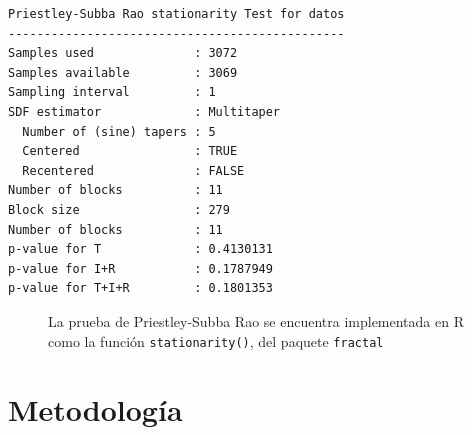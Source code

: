 \documentclass{beamer}
\begin{document}

\begin{lrbox}{\mybox}%
\begin{lstlisting}[caption={}]
Priestley-Subba Rao stationarity Test for datos
-----------------------------------------------
Samples used              : 3072 
Samples available         : 3069 
Sampling interval         : 1 
SDF estimator             : Multitaper 
  Number of (sine) tapers : 5 
  Centered                : TRUE 
  Recentered              : FALSE 
Number of blocks          : 11 
Block size                : 279 
Number of blocks          : 11 
p-value for T             : 0.4130131 
p-value for I+R           : 0.1787949 
p-value for T+I+R         : 0.1801353 
\end{lstlisting}
\end{lrbox}%

\begin{frame}[fragile]
\begin{figure}
\scalebox{0.8}{\usebox{\mybox}}
\caption{La prueba de Priestley-Subba Rao se encuentra implementada en R como la funci\'on 
\texttt{stationarity()}, del paquete \texttt{fractal}}
\end{figure}
\end{frame}


\section{Metodolog\'ia}



\end{document}
